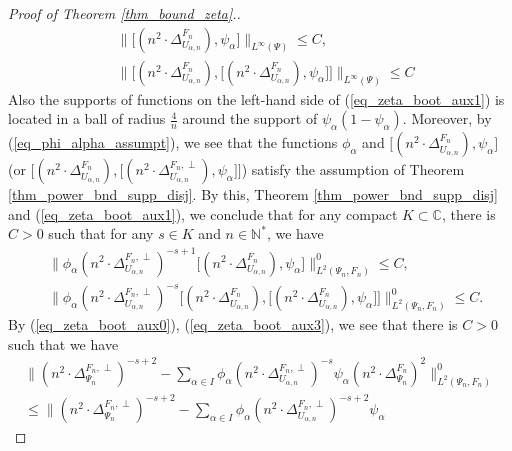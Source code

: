 \documentclass[12pt]{article}
\numberwithin{equation}{section}
\theoremstyle{theorem}
\theoremstyle{definition}
\theoremstyle{remark}
\newcommand{\comp}{\mathbb{C}}
\newcommand{\nat}{\mathbb{N}}
\newcommand{\laplcomp}{\Delta}
\begin{document}
\begin{proof}[Proof of Theorem \ref{thm_bound_zeta}.]
\begin{equation}
\begin{aligned}
			&
			\Big\| \big[(n^2 \cdot \laplcomp_{U_{\alpha, n}}^{F_n}), \psi_{\alpha} \big] \Big\|_{L^{\infty}(\Psi)} \leq  C,
			\\
			&
			\Big\| \Big[(n^2 \cdot \laplcomp_{U_{\alpha, n}}^{F_n}),
			\big[(n^2 \cdot \laplcomp_{U_{\alpha, n}}^{F_n}), 
			\psi_{\alpha} \big] \Big] \Big\|_{L^{\infty}(\Psi)} \leq C
		\end{aligned}
		\end{equation}
		Also the supports of functions on the left-hand side of (\ref{eq_zeta_boot_aux1}) is located in a ball of radius $\frac{4}{n}$ around the support of $\psi_{\alpha}(1-\psi_{\alpha})$.
		Moreover, by (\ref{eq_phi_alpha_assumpt}), we see that the functions $\phi_{\alpha}$ and $\big[(n^2 \cdot \laplcomp_{U_{\alpha, n}}^{F_n}), \psi_{\alpha} \big]$ (or $\big[(n^2 \cdot \laplcomp_{U_{\alpha, n}}^{F_n}),
			\big[(n^2 \cdot \laplcomp_{U_{\alpha, n}}^{F_n, \perp}), 
			\psi_{\alpha} \big] \big]$) satisfy the assumption of Theorem \ref{thm_power_bnd_supp_disj}.
		By this, Theorem \ref{thm_power_bnd_supp_disj} and (\ref{eq_zeta_boot_aux1}), we conclude that for any compact $K \subset \comp$, there is $C > 0$ such that for any $s \in K$ and $n \in \nat^*$, we have
		\begin{equation}\label{eq_zeta_boot_aux3}
		\begin{aligned}
			&
			\Big\| \phi_{\alpha} (n^2 \cdot  \laplcomp_{U_{\alpha, n}}^{F_n, \perp})^{-s + 1} 
			\big[(n^2 \cdot \laplcomp_{U_{\alpha, n}}^{F_n}), \psi_{\alpha} \big] \Big\|_{L^2(\Psi_n, F_n)}^{0} 
			\leq  C,
			\\
			&
			\Big\| 
			\phi_{\alpha} (n^2 \cdot  \laplcomp_{U_{\alpha, n}}^{F_n, \perp})^{-s} 
			\Big[(n^2 \cdot \laplcomp_{U_{\alpha, n}}^{F_n}),
			\big[(n^2 \cdot \laplcomp_{U_{\alpha, n}}^{F_n}), 
			\psi_{\alpha} \big] \Big]
			\Big\|_{L^2(\Psi_n, F_n)}^{0} 
			\leq C.
		\end{aligned}
		\end{equation}
		By (\ref{eq_zeta_boot_aux0}), (\ref{eq_zeta_boot_aux3}), we see that there is $C > 0$ such that we have
		\begin{multline}\label{eq_zeta_boot_aux4}
		\Big\| 
			(n^2 \cdot\laplcomp_{\Psi_n}^{F_n, \perp})^{-s+2} 
			- 
			\sum_{\alpha \in I} \phi_{\alpha} (n^2 \cdot  \laplcomp_{U_{\alpha, n}}^{F_n, \perp})^{-s} \psi_{\alpha}
			(n^2 \cdot\laplcomp_{\Psi_n}^{F_n})^{2}
			\Big\|_{L^2(\Psi_n, F_n)}^{0}
			\\
			\leq 
			\Big\| 
			(n^2 \cdot\laplcomp_{\Psi_n}^{F_n, \perp})^{-s+2} 
			- 
			\sum_{\alpha \in I} \phi_{\alpha} (n^2 \cdot  \laplcomp_{U_{\alpha, n}}^{F_n, \perp})^{-s + 2} \psi_{\alpha}

\end{multline}
\end{proof}
\end{document}
